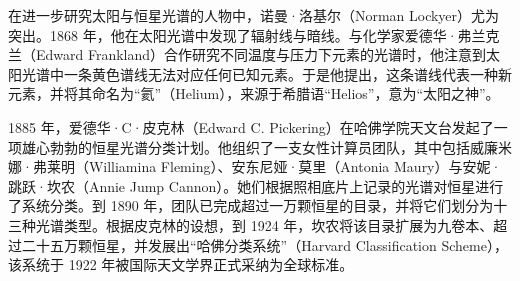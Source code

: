 在进一步研究太阳与恒星光谱的人物中，诺曼·洛基尔（Norman Lockyer）尤为突出。1868 年，他在太阳光谱中发现了辐射线与暗线。与化学家爱德华·弗兰克兰（Edward Frankland）合作研究不同温度与压力下元素的光谱时，他注意到太阳光谱中一条黄色谱线无法对应任何已知元素。于是他提出，这条谱线代表一种新元素，并将其命名为“氦”（Helium），来源于希腊语“Helios”，意为“太阳之神”。\cite{ref18,ref19}

1885 年，爱德华·C·皮克林（Edward C. Pickering）在哈佛学院天文台发起了一项雄心勃勃的恒星光谱分类计划。他组织了一支女性计算员团队，其中包括威廉米娜·弗莱明（Williamina Fleming）、安东尼娅·莫里（Antonia Maury）与安妮·跳跃·坎农（Annie Jump Cannon）。她们根据照相底片上记录的光谱对恒星进行了系统分类。到 1890 年，团队已完成超过一万颗恒星的目录，并将它们划分为十三种光谱类型。根据皮克林的设想，到 1924 年，坎农将该目录扩展为九卷本、超过二十五万颗恒星，并发展出“哈佛分类系统”（Harvard Classification Scheme），该系统于 1922 年被国际天文学界正式采纳为全球标准。\cite{ref20}
